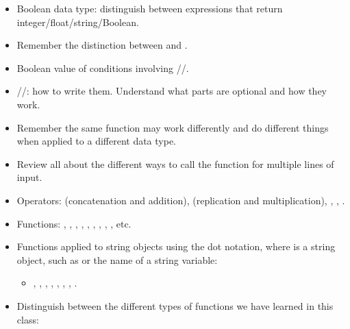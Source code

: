 \documentclass[letterpaper,10pt,english]{sphinxmanual}
\begin{document}
\begin{itemize}
\item {} 
Boolean data type: distinguish between expressions that return
integer/float/string/Boolean.

\item {} 
Remember the distinction between \sphinxcode{\sphinxupquote{=}} and \sphinxcode{\sphinxupquote{==}}.

\item {} 
Boolean value of conditions involving //.

\item {} 
//:  how to write them. Understand what parts
are optional and how they work.

\item {} 
Remember the same function may work differently and do different
things when applied to a different data type.

\item {} 
Review all about the different ways to call the  function for
multiple lines of input.

\item {} 
Operators: \sphinxcode{\sphinxupquote{+}} (concatenation and addition), \sphinxcode{\sphinxupquote{*}} (replication
and multiplication), \sphinxcode{\sphinxupquote{/}}, \sphinxcode{\sphinxupquote{\%}}, \sphinxcode{\sphinxupquote{**}}.

\item {} 
Functions:  , , ,
, , , ,
, , etc.

\item {} 
Functions applied to string objects using the dot notation, where
 is a string object, such as  or the name of a
string variable:
\begin{itemize}
\item {} 
, , ,
, ,
, , .

\end{itemize}

\item {} 
Distinguish between the different types of functions we have
learned in this class:

\end{itemize}
\end{document}
